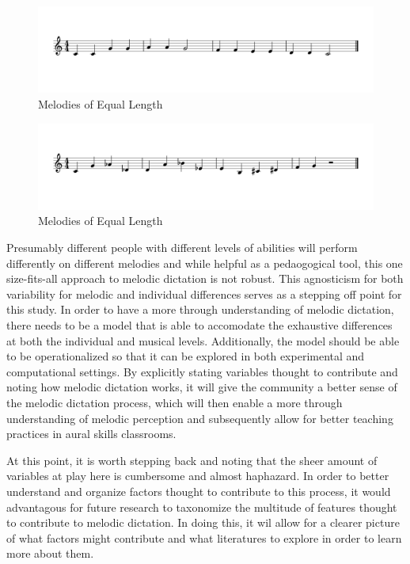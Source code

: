 \documentclass[]{book}
\theoremstyle{definition}
\theoremstyle{definition}
\theoremstyle{definition}
\theoremstyle{remark}
\begin{document}
\begin{figure}

{\centering \includegraphics{img/musicalexamples/MMD_Figure2-1.png} 

}

\caption{Melodies of Equal Length}\label{fig:unnamed-chunk-1}
\end{figure}
\begin{figure}

{\centering \includegraphics{img/musicalexamples/MMD_Figure3-1.png} 

}

\caption{Melodies of Equal Length}\label{fig:unnamed-chunk-1}
\end{figure}

Presumably different people with different levels of abilities will
perform differently on different melodies and while helpful as a
pedaogogical tool, this one size-fits-all approach to melodic dictation
is not robust. This agnosticism for both variability for melodic and
individual differences serves as a stepping off point for this study. In
order to have a more through understanding of melodic dictation, there
needs to be a model that is able to accomodate the exhaustive
differences at both the individual and musical levels. Additionally, the
model should be able to be operationalized so that it can be explored in
both experimental and computational settings. By explicitly stating
variables thought to contribute and noting how melodic dictation works,
it will give the community a better sense of the melodic dictation
process, which will then enable a more through understanding of melodic
perception and subsequently allow for better teaching practices in aural
skills classrooms.

At this point, it is worth stepping back and noting that the sheer
amount of variables at play here is cumbersome and almost haphazard. In
order to better understand and organize factors thought to contribute to
this process, it would advantagous for future research to taxonomize the
multitude of features thought to contribute to melodic dictation. In
doing this, it wil allow for a clearer picture of what factors might
contribute and what literatures to explore in order to learn more about
them.
\end{document}
